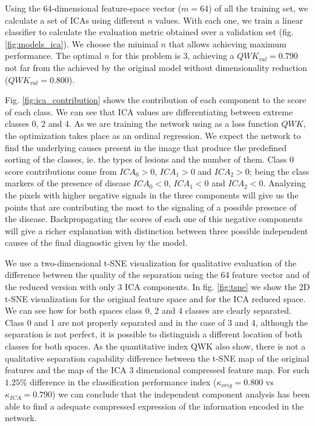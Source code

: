 Using the 64-dimensional feature-space vector ($m=64$) of all the training set, we calculate a set of ICAs using different $n$ values. With each one, we train a linear classifier to calculate the evaluation metric obtained over a validation set (fig. \ref{fig:models_ica}). We choose the minimal $n$ that allows achieving maximum performance. The optimal $n$ for this problem is $3$, achieving a $QWK_{val} = 0.790$ not far from the achieved by the original model without dimensionality reduction ($QWK_{val} = 0.800$).

Fig. \ref{fig:ica_contribution} shows the contribution of each component to the score of each class. We can see that ICA values are differentiating between extreme classes 0, 2 and 4. As we are training the network using as a loss function $QWK$, the optimization takes place as an ordinal regression. We expect the network to find the underlying causes present in the image that produce the predefined sorting of the classes, ie. the types of lesions and the number of them. Class 0 score contributions come from $ICA_0 > 0$, $ICA_1 > 0$ and $ICA_2 > 0$; being the class markers of the presence of disease $ICA_0 < 0$, $ICA_1 < 0$ and $ICA_2 < 0$. Analyzing the pixels with higher negative signals in the three components will give us the points that are contributing the most to the signaling of a possible presence of the disease. Backpropagating the scores of each one of this negative components will give a richer explanation with distinction between three possible independent causes of the final diagnostic given by the model.

We use a two-dimensional t-SNE visualization \citep{maaten2008visualizing} for qualitative evaluation of the difference between the quality of the separation using the 64 feature vector and of the reduced version with only 3 ICA components. In fig. \ref{fig:tsne} we show the 2D t-SNE visualization for the original feature space and for the ICA reduced space. We can see how for both spaces class 0, 2 and 4 classes are clearly separated. Class 0 and 1 are not properly separated and in the case of 3 and 4, although the separation is not perfect, it is possible to distinguish a different location of both classes for both spaces. As the quantitative index QWK also show, there is not a qualitative separation capability difference between the t-SNE map of the original features and the map of the ICA 3 dimensional compressed feature map. For such $1.25\%$ difference in the classification performance index ($\kappa_{orig} = 0.800$ vs $\kappa_{ICA} = 0.790$) we can conclude that the independent component analysis has been able to find a adequate compressed expression of the information encoded in the network. 

